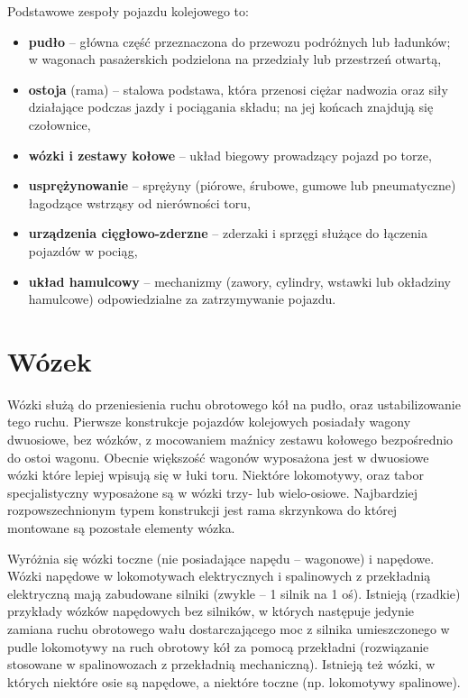 Podstawowe zespoły pojazdu kolejowego to:
\begin{itemize}
	\item \textbf{pudło} – główna część przeznaczona do przewozu podróżnych lub ładunków; w wagonach pasażerskich podzielona na przedziały lub przestrzeń otwartą,
	\item \textbf{ostoja} (rama) – stalowa podstawa, która przenosi ciężar nadwozia oraz siły działające podczas jazdy i pociągania składu; na jej końcach znajdują się czołownice,
	\item \textbf{wózki i zestawy kołowe} – układ biegowy prowadzący pojazd po torze,
	\item \textbf{usprężynowanie} – sprężyny (piórowe, śrubowe, gumowe lub pneumatyczne) łagodzące wstrząsy od nierówności toru,
	\item \textbf{urządzenia cięgłowo-zderzne} – zderzaki i sprzęgi służące do łączenia pojazdów w pociąg,
	\item \textbf{układ hamulcowy} – mechanizmy (zawory, cylindry, wstawki lub okładziny hamulcowe) odpowiedzialne za zatrzymywanie pojazdu.
\end{itemize}

\section{Wózek}

Wózki służą do przeniesienia ruchu obrotowego kół na pudło, oraz ustabilizowanie tego ruchu. Pierwsze konstrukcje pojazdów kolejowych posiadały wagony dwuosiowe, bez wózków, z mocowaniem maźnicy zestawu kołowego bezpośrednio do ostoi wagonu. Obecnie większość wagonów wyposażona jest w dwuosiowe wózki które lepiej wpisują się w łuki toru. Niektóre lokomotywy, oraz tabor specjalistyczny wyposażone są w wózki trzy- lub wielo-osiowe. Najbardziej rozpowszechnionym typem konstrukcji jest rama skrzynkowa do której montowane są pozostałe elementy wózka.

Wyróżnia się wózki toczne (nie posiadające napędu – wagonowe) i napędowe. Wózki napędowe w lokomotywach elektrycznych i spalinowych z przekładnią elektryczną mają zabudowane silniki (zwykle – 1 silnik na 1 oś). Istnieją (rzadkie) przykłady wózków napędowych bez silników, w których następuje jedynie zamiana ruchu obrotowego wału dostarczającego moc z silnika umieszczonego w pudle lokomotywy na ruch obrotowy kół za pomocą przekładni (rozwiązanie stosowane w spalinowozach z przekładnią mechaniczną). Istnieją też wózki, w których niektóre osie są napędowe, a niektóre toczne (np. lokomotywy spalinowe).

